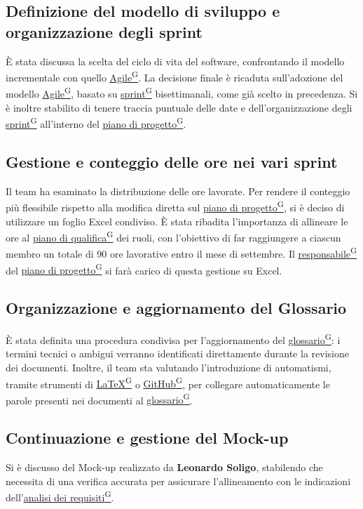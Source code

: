 \documentclass[a4paper,12pt]{article}
\providecommand{\glslink}[2]{\href{https://alittlebyte-19.github.io/Documentazione/glossario.html\#gls-#1}{\underline{#2}\textsuperscript{\scriptsize G}}}
\begin{document}
\subsection{Definizione del modello di sviluppo e organizzazione degli sprint}
È stata discussa la scelta del ciclo di vita del software, confrontando il modello incrementale con quello \glslink{agile}{Agile}. La decisione finale è ricaduta sull'adozione del modello \glslink{agile}{Agile}, basato su \glslink{sprint}{sprint} bisettimanali, come già scelto in precedenza. 
Si è inoltre stabilito di tenere traccia puntuale delle date e dell'organizzazione degli \glslink{sprint}{sprint} all'interno del \glslink{piano-di-progetto}{piano di progetto}.

\subsection{Gestione e conteggio delle ore nei vari sprint}
Il team ha esaminato la distribuzione delle ore lavorate. 
Per rendere il conteggio più flessibile rispetto alla modifica diretta sul \glslink{piano-di-progetto}{piano di progetto}, si è deciso di utilizzare un foglio Excel condiviso. 
È stata ribadita l'importanza di allineare le ore al \glslink{piano-di-qualifica}{piano di qualifica} dei ruoli, con l'obiettivo di far raggiungere a ciascun membro un totale di 90 ore lavorative entro il mese di settembre. 
Il \glslink{responsabile}{responsabile} del \glslink{piano-di-progetto}{piano di progetto} si farà carico di questa gestione su Excel.

\subsection{Organizzazione e aggiornamento del Glossario}
È stata definita una procedura condivisa per l'aggiornamento del \glslink{glossario}{glossario}: i termini tecnici o ambigui verranno identificati direttamente durante la revisione dei documenti. 
Inoltre, il team sta valutando l'introduzione di automatismi, tramite strumenti di \glslink{latex}{LaTeX} o \glslink{github}{GitHub}, per collegare automaticamente le parole presenti nei documenti al \glslink{glossario}{glossario}.

\subsection{Continuazione e gestione del Mock-up}
Si è discusso del Mock-up realizzato da \textbf{Leonardo Soligo}, stabilendo che necessita di una verifica accurata per assicurare l'allineamento con le indicazioni dell'\glslink{analisi-dei-requisiti-adr}{analisi dei requisiti}.
\end{document}
